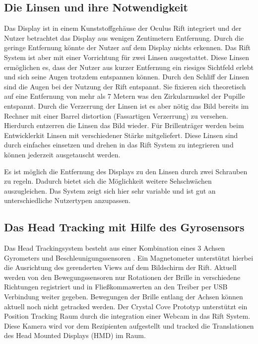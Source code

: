 \documentclass[pagesize, paper=a4, fontsize=12pt,titlepage=true, headings=small, headnosepline, abstractoff, liststotoc, nochapterprefix, plainheadsepline]{scrreprt}
\begin{document}
\subsection{Die Linsen und ihre Notwendigkeit}
Das Display ist in einem Kunststoffgehäuse der Oculus Rift integriert und der Nutzer betrachtet das Display aus wenigen Zentimetern Entfernung. Durch die geringe Entfernung könnte der Nutzer auf dem Display nichts erkennen. Das Rift System ist aber mit einer Vorrichtung für zwei Linsen ausgestattet. Diese Linsen ermöglichen es, dass der Nutzer aus kurzer Entfernung ein riesiges Sichtfeld erlebt und sich seine Augen trotzdem entspannen können. Durch den Schliff der Linsen sind die Augen bei der Nutzung der Rift entspannt. Sie fixieren sich theoretisch auf eine Entfernung von mehr als 7 Metern was den Zirkularmuskel der Pupille entspannt. Durch die Verzerrung der Linsen ist es aber nötig das Bild bereits im Rechner mit einer Barrel distortion (Fassartigen Verzerrung) zu versehen. Hierdurch entzerren die Linsen das Bild wieder. Für Brillenträger werden beim Entwicklerkit Linsen mit verschiedener Stärke mitgeliefert. Diese Linsen sind durch einfaches einsetzen und drehen in das Rift System zu integrieren und können jederzeit ausgetauscht werden.

Es ist möglich die Entfernung des Displays zu den Linsen durch zwei Schrauben zu regeln. Dadurch bietet sich die Möglichkeit weitere Sehschwächen auszugleichen. Das System zeigt sich hier sehr variable und ist gut an unterschiedliche Nutzertypen anzupassen.

\subsection{Das Head Tracking mit Hilfe des Gyrosensors}
Das Head Trackingsystem besteht aus einer Kombination eines 3 Achsen Gyrometers und Beschleunigungssensoren . Ein Magnetometer unterstützt hierbei die Ausrichtung des gerenderten Views auf dem Bildschirm der Rift. Aktuell werden von den Bewegungssensoren nur Rotationen der Brille in verschiedene Richtungen registriert und in Fließkommawerten an den Treiber per USB Verbindung weiter gegeben. Bewegungen der Brille entlang der Achsen können aktuell noch nicht getracked werden. Der Crystal Cove Prototyp unterstützt ein Position Tracking Raum durch die integration einer Webcam in das Rift System. Diese Kamera wird vor dem Rezipienten aufgestellt und tracked die Translationen des Head Mounted Displays (HMD) im Raum.
\end{document}
